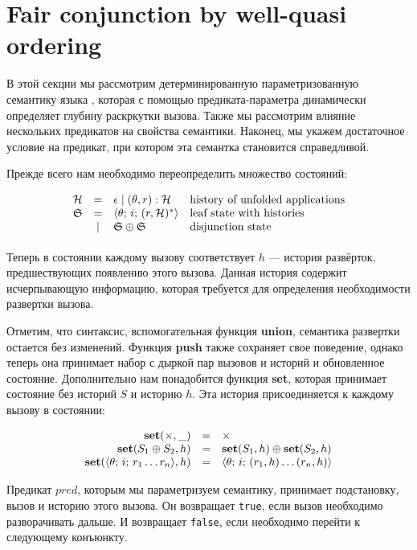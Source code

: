 \section{Fair conjunction by well-quasi ordering}
\label{sec:fair-semantics}

В этой секции мы рассмотрим детерминированную параметризованную семантику языка \mk, которая с помощью предиката-параметра динамически определяет глубину раскркутки вызова. Также мы рассмотрим влияние нескольких предикатов на свойства семантики. Наконец, мы укажем достаточное условие на предикат, при котором эта семантка становится справедливой.

Прежде всего нам необходимо переопределить множество состояний:

\[
\begin{array}{rcll}
\mathcal{H} & = & \epsilon \mid (\theta, r) : \mathcal{H} & \mbox{history of unfolded applications}\\
\mathfrak{S} & = & \langle \theta;\, i;\, (r, \mathcal{H})^* \rangle & \mbox{leaf state with histories}\\
             & \mid &\mathfrak{S} \oplus \mathfrak{S} & \mbox{disjunction state} \\[1mm]
\end{array}
\]

\noindent Теперь в состоянии каждому вызову соответствует $h$ --- история развёрток, предшествующих появлению этого вызова. Данная история содержит исчерпывающую информацию, которая требуется для определения необходимости развертки вызова.  

Отметим, что синтаксис, вспомогательная функция {\bf union}, семантика развертки остается без изменений. Функция {\bf push} также сохраняет свое поведение, однако теперь она принимает набор  с дыркой пар вызовов и историй и обновленное состояние. Дополнительно нам понадобится функция {\bf set}, которая принимает состояние без историй $S$ и историю $h$. Эта история присоединяется к каждому вызову в состоянии:

\[
\begin{array}{rcl}
    \mbox{\bf set}(\times, \_) & = & \times \\
    \mbox{\bf set}(S_1 \oplus S_2, h) & = & \mbox{\bf set}(S_1, h) \oplus \mbox{\bf set}(S_2, h) \\
    \mbox{\bf set}(\langle \theta;\, i;\, r_1\ldots r_n \rangle, h) & = & \langle \theta;\, i;\, (r_1, h) \ldots (r_n, h) \rangle 
\end{array}
\]

Предикат $pred$, которым мы параметризуем семантику, принимает подстановку, вызов и историю этого вызова. Он возвращает \lstinline|true|, если вызов необходимо разворачивать дальше. И возвращает \lstinline|false|, если необходимо перейти к следующему конъюнкту.


